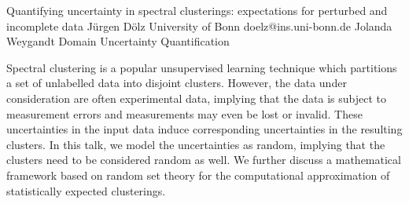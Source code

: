\begin{talk}
\end{talk}

\begin{talk}
  {Quantifying uncertainty in spectral clusterings: expectations for perturbed and incomplete data}%
  {J\"urgen D\"olz}%
  {University of Bonn}%
  {doelz@ins.uni-bonn.de}%
  {Jolanda Weygandt}%
  {Domain Uncertainty Quantification}%
    
   
Spectral clustering is a popular unsupervised learning technique which partitions a set of unlabelled data into disjoint clusters. However, the data under consideration are often experimental data, implying that the data is subject to measurement errors and measurements may even be lost or invalid. These uncertainties in the input data induce corresponding uncertainties in the resulting clusters. In this talk, we model the uncertainties as random, implying that the clusters need to be considered random as well. We further discuss a mathematical framework based on random set theory for the computational approximation of statistically expected clusterings.
\end{talk}

